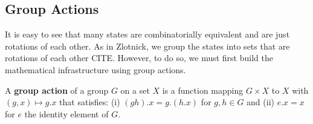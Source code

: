 


\subsection{Group Actions}

It is easy to see that many states are combinatorially equivalent and are just rotations of each other. As in Zlotnick, we group the states into sets that are rotations of each other CITE. However, to do so, we must first build the mathematical infrastructure using group actions. 

\begin{mydef}%
A \textbf{group action} of a group $G$ on a set $X$ is a function mapping $G \times X$ to $X$ with $(g, x) \mapsto g.x$ that satisfies: (i) $(gh).x = g.(h.x)$ for $g,h \in G$ and (ii) $e.x = x$ for $e$ the identity element of $G$.
\end{mydef}

